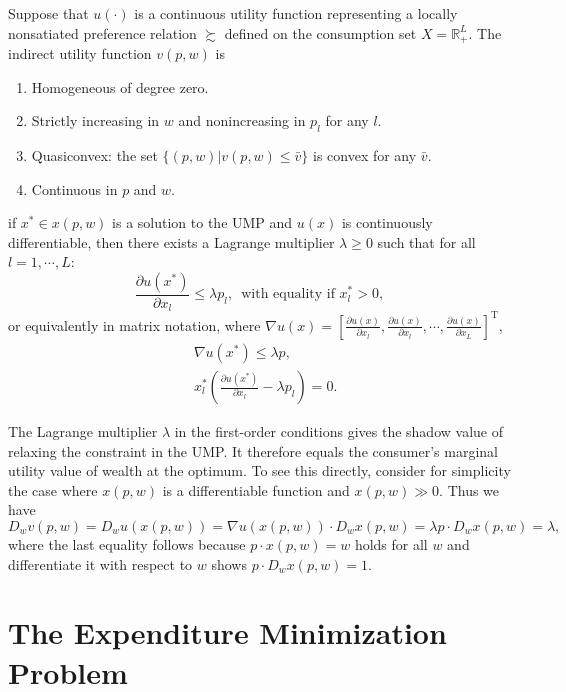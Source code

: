 \documentclass[12pt,fleqn]{book} %
\begin{document}
\begin{proposition}
	Suppose that $u(\cdot)$ is a continuous utility function representing a
	locally nonsatiated preference relation $\succsim$ defined on the consumption set $X=\mathbb{R}_+^L$. The indirect utility function $v(p, w)$ is	
	\begin{enumerate}
		\item Homogeneous of degree zero.
		\item Strictly increasing in $w$ and nonincreasing in $p_l$ for any $l$.
		\item Quasiconvex: the set $\{(p, w)| v(p, w)\le \bar{v}\}$ is convex for any $\bar{v}$.
		\item Continuous in $p$ and $w$. 
	\end{enumerate}
\end{proposition}

\begin{theorem}
	if $x^* \in x(p,w)$ is a solution to the UMP and $u(x)$ is continuously differentiable, then there exists a
	Lagrange multiplier $\lambda\ge0$ such that for all $l = 1,\cdots, L$:
	\[
	\frac{\partial u(x^*)}{\partial x_l}\le \lambda p_l,\ \;\text{with equality if } x^*_l > 0,
	\]
	or equivalently in matrix notation, where $\nabla u(x)= \left[\frac{\partial u(x)}{\partial x_l},\frac{\partial u(x)}{\partial x_l},\cdots,\frac{\partial u(x)}{\partial x_L} \right]^\mathrm{T}$,
	\begin{align*}
	&\nabla u(x^*)\le \lambda p, \\
    &x^*_l\left(\frac{\partial u(x^*)}{\partial x_l}-\lambda p_l\right)= 0.
	\end{align*}
\end{theorem}

The Lagrange multiplier $\lambda$ in the first-order conditions gives
the shadow value of relaxing the constraint in the UMP. It therefore equals the consumer's marginal utility value of wealth at the optimum.
To see this directly, consider for simplicity the case where $x(p, w)$
is a differentiable function and $x(p, w) \gg 0$. Thus we have
\[
D_wv(p,w)=D_wu(x(p,w))=\nabla u(x(p,w))\cdot D_wx(p,w)=\lambda p\cdot D_wx(p,w)=\lambda,
\]
where the last equality follows because $p\cdot x(p, w) = w$ holds for all $w$ and differentiate it with respect to $w$ shows $p\cdot D_wx(p,w)= 1$.



\section{The Expenditure Minimization Problem}
\end{document}
